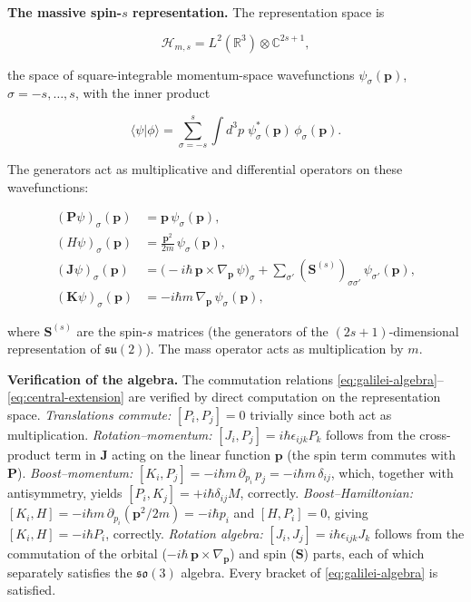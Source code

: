 \medskip\noindent\textbf{The massive spin-$s$ representation.} The representation space is
\begin{linenomath}
\begin{equation}
\mathcal{H}_{m,s} = L^{2}(\mathbb{R}^{3})\otimes\mathbb{C}^{2s+1},
\label{eq:galilei-unirrep-space}
\end{equation}
\end{linenomath}
the space of square-integrable momentum-space wavefunctions $\psi_{\sigma}(\bm p)$, $\sigma = -s,\ldots,s$, with the inner product
\begin{linenomath}
\begin{equation}
\langle\psi|\phi\rangle = \sum_{\sigma=-s}^{s}\int d^{3}p\;\psi_{\sigma}^{*}(\bm p)\,\phi_{\sigma}(\bm p).
\label{eq:momentum-inner-product}
\end{equation}
\end{linenomath}
The generators act as multiplicative and differential operators on these wavefunctions:
\begin{linenomath}
\begin{align}
(\bm P\psi)_{\sigma}(\bm p) &= \bm p\,\psi_{\sigma}(\bm p), \label{eq:unirrep-P} \\[4pt]
(H\psi)_{\sigma}(\bm p) &= \frac{\bm p^{2}}{2m}\,\psi_{\sigma}(\bm p), \label{eq:unirrep-H} \\[4pt]
(\bm J\psi)_{\sigma}(\bm p) &= \bigl(-i\hbar\,\bm p\times\nabla_{\bm p}\,\psi\bigr)_{\sigma} + \sum_{\sigma'}(\bm S^{(s)})_{\sigma\sigma'}\,\psi_{\sigma'}(\bm p), \label{eq:unirrep-J} \\[4pt]
(\bm K\psi)_{\sigma}(\bm p) &= -i\hbar m\,\nabla_{\bm p}\,\psi_{\sigma}(\bm p), \label{eq:unirrep-K}
\end{align}
\end{linenomath}
where $\bm S^{(s)}$ are the spin-$s$ matrices (the generators of the $(2s+1)$-dimensional representation of $\mathfrak{su}(2)$). The mass operator acts as multiplication by $m$.

\medskip\noindent\textbf{Verification of the algebra.} The commutation relations \eqref{eq:galilei-algebra}--\eqref{eq:central-extension} are verified by direct computation on the representation space. \emph{Translations commute:} $[P_i,P_j] = 0$ trivially since both act as multiplication. \emph{Rotation--momentum:} $[J_i,P_j] = i\hbar\epsilon_{ijk}P_k$ follows from the cross-product term in $\bm J$ acting on the linear function $\bm p$ (the spin term commutes with $\bm P$). \emph{Boost--momentum:} $[K_i,P_j] = -i\hbar m\,\partial_{p_i}\,p_j = -i\hbar m\,\delta_{ij}$, which, together with antisymmetry, yields $[P_i,K_j] = +i\hbar\delta_{ij}M$, correctly. \emph{Boost--Hamiltonian:} $[K_i,H] = -i\hbar m\,\partial_{p_i}(\bm p^{2}/2m) = -i\hbar p_i$ and $[H,P_i]=0$, giving $[K_i,H] = -i\hbar P_i$, correctly. \emph{Rotation algebra:} $[J_i,J_j] = i\hbar\epsilon_{ijk}J_k$ follows from the commutation of the orbital ($-i\hbar\,\bm p\times\nabla_{\bm p}$) and spin ($\bm S$) parts, each of which separately satisfies the $\mathfrak{so}(3)$ algebra. Every bracket of \eqref{eq:galilei-algebra} is satisfied.

